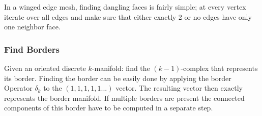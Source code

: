 In a winged edge mesh, finding dangling faces is fairly simple; at every vertex iterate over all edges and make sure that either exactly 2 or no edges have only one neighbor face.
%	
	
	
	
\subsubsection{Find Borders}
Given an oriented discrete $k$-manifold: find the $(k-1)$-complex that represents its border. Finding the border can be easily done by applying the border Operator $\delta_k$ to the $(1,1,1,1,1...)$ vector. The resulting vector then exactly represents the border manifold. If multiple borders are present the connected components of this border have to be computed in a separate step.
	
